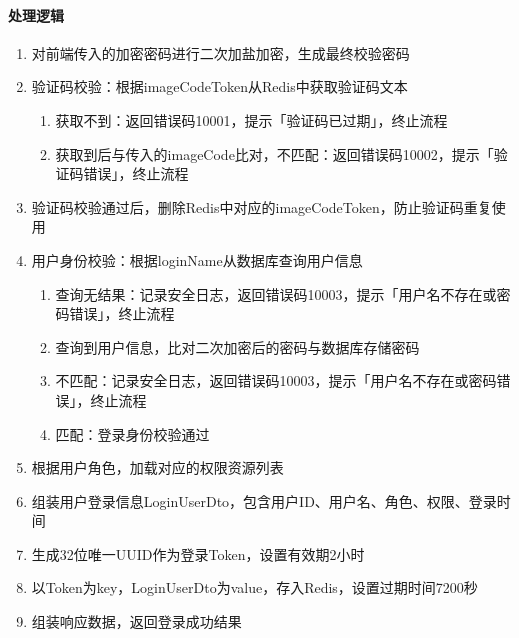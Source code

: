 \documentclass[12pt, a4paper]{article}
\begin{document}
\paragraph{处理逻辑}
\begin{enumerate}
\item 对前端传入的加密密码进行二次加盐加密，生成最终校验密码

\item 验证码校验：根据imageCodeToken从Redis中获取验证码文本

\begin{enumerate}
\item 获取不到：返回错误码10001，提示「验证码已过期」，终止流程

\item 获取到后与传入的imageCode比对，不匹配：返回错误码10002，提示「验证码错误」，终止流程
\end{enumerate}

\item 验证码校验通过后，删除Redis中对应的imageCodeToken，防止验证码重复使用

\item 用户身份校验：根据loginName从数据库查询用户信息

\begin{enumerate}
\item 查询无结果：记录安全日志，返回错误码10003，提示「用户名不存在或密码错误」，终止流程

\item 查询到用户信息，比对二次加密后的密码与数据库存储密码

\item 不匹配：记录安全日志，返回错误码10003，提示「用户名不存在或密码错误」，终止流程

\item 匹配：登录身份校验通过    
\end{enumerate}

\item 根据用户角色，加载对应的权限资源列表

\item 组装用户登录信息LoginUserDto，包含用户ID、用户名、角色、权限、登录时间

\item 生成32位唯一UUID作为登录Token，设置有效期2小时

\item 以Token为key，LoginUserDto为value，存入Redis，设置过期时间7200秒

\item 组装响应数据，返回登录成功结果
\end{enumerate}
\end{document}
